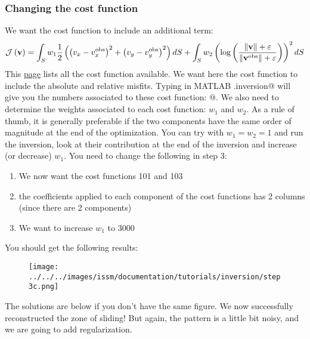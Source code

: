 \subsubsection{Changing the cost function}
We want the cost function to include an additional term:
\begin{equation}
	{\mathcal J\left({\bf v}\right)}
	=\int_{S} w_1 \dfrac{1}{2}\left(
	\left(v_x-v_x^{\text{obs}}\right)^{2}
	+\left(v_y-v_y^{\text{obs}}\right)^{2}
	\right) dS
	+\int_{S} w_2 \left(\text{log}\left(
	\dfrac{\|{\bf v}\|+\varepsilon}{\|{\bf v}^{\text{obs}}\|+\varepsilon}
	\right) \right)^2 dS
\end{equation}
This \href{http://issm.jpl.nasa.gov/documentation/inversions/}{page} lists all the cost function available. We want here the cost function to include the absolute and relative misfits. Typing in MATLAB \verb@md.inversion@ will give you the numbers associated to these cost function: \verb@[101,103]@. We also need to determine the weights associated to each cost function: $w_1$ and $w_2$. As a rule of thumb, it is generally preferable if the two components have the same order of magnitude at the end of the optimization. You can try with $w_1=w_2=1$ and run the inversion, look at their contribution at the end of the inversion and increase (or decrease) $w_1$. You need to change the following in step 3:
\begin{enumerate}
	\item We now want the cost functions 101 and 103
	\item the coefficients applied to each component of the cost functions has 2 columns (since there are 2 components)
	\item We want to increase $w_1$ to 3000
\end{enumerate}
You should get the following results:
\begin{figure}[H]
	\begin{center}
		\texttt{[image: ../../../images/issm/documentation/tutorials/inversion/step3c.png]}
	\end{center}
\end{figure}
The solutions are below if you don't have the same figure. We now successfully reconstructed the zone of sliding! But again, the pattern is a little bit noisy, and we are going to add regularization.

